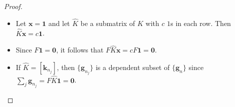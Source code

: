 \documentclass{beamer}
\renewcommand{\vec}[1]{\mathbf{#1}}
\begin{document}
{\begin{frame}
\begin{proof}
\begin{itemize}
            \item <2-> Let $\vec{x} = \vec{1}$ and let $\widehat{K}$ be a submatrix of $K$ with $c$ $1$s in each row.
            Then $\widehat{K}\vec{x} = c\vec{1}$.

            \item <3-> Since $F\vec{1} = \vec{0}$, it follows that $F\widehat{K}\vec{x} = cF\vec{1} = \vec{0}$.

            \item <4-> If $\widehat{K} = [\vec{k}_{n_j}]$, then $\{\vec{g}_{n_j}\}$ is a dependent subset of $\{\vec{g}_n\}$ since $\sum_j \vec{g}_{n_j} = F\widehat{K}\vec{1} = \vec{0}$.

        \end{itemize}
    \end{proof}



\end{frame}

}
\end{document}
